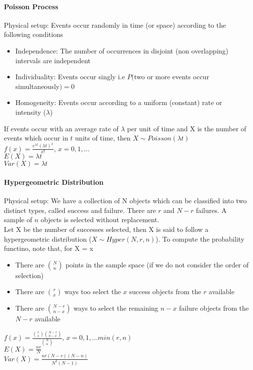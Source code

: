     \paragraph{Poisson Process}
      Physical setup: Events occur randomly in time (or space) according to the
      following conditions
      \begin{itemize}
        \item Independence: The number of occurrences in disjoint (non
          overlapping) intervals are independent
        \item Individuality: Events occur singly i.e $P($two or more events
          occur simultaneously$) = 0$
        \item Homogeneity: Events occur according to a uniform (constant) rate
          or intensity ($\lambda$)
      \end{itemize}
      If events occur with an average rate of $\lambda$ per unit of time
      and X is the number of events which occur in $t$ units of time, then $X
      \sim Poisson(\lambda t)$\\
      $f(x) = \frac{e^{\lambda t}(\lambda t)^x}{x!}$, $x = 0, 1, ...$\\
      $E(X) = \lambda t$\\
      $Var(X) = \lambda t$

    \paragraph{Hypergeometric Distribution}
      Physical setup: We have a collection of N objects which can be classified
      into two distinct types, called success and failure. There are $r$ and $N
      - r$ failures. A sample of $n$ objects is selected without replacement.\\
      Let X be the number of successes selected, then X is said to follow a
      hypergeometric distribution ($X \sim Hyper(N, r, n)$). To compute the
      probability functino, note that, for X = x
      \begin{itemize}
        \item There are $\binom{N}{n}$ points in the sample space (if we do not
          consider the order of selection)
        \item There are $\binom{r}{x}$ ways too select the $x$ success objects
          from the $r$ available
        \item There are $\binom{N-r}{n-x}$ ways to select the remaining $n-x$
          failure objects from the $N-r$ available
      \end{itemize}
      $f(x) = \frac{\binom{r}{x}\binom{N-r}{n-x}}{\binom{N}{n}}$, $x = 0, 1,
      ... min(r, n)$\\
      $E(X) = \frac{nr}{N}$\\
      $Var(X) = \frac{nr(N-r)(N-n)}{N^2(N-1)}$

